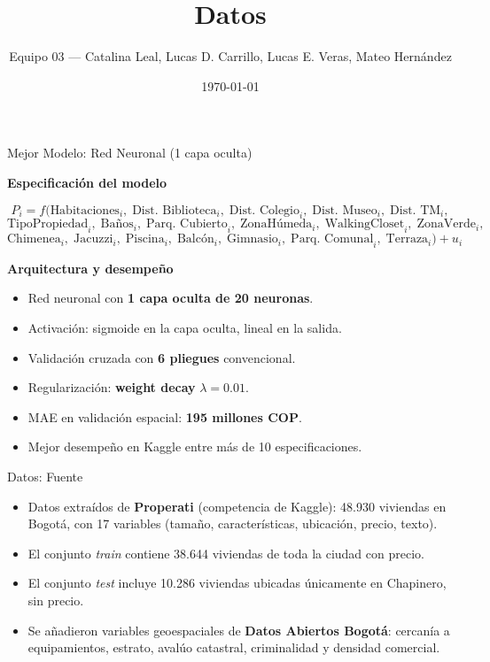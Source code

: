 \documentclass[10pt]{beamer}
\title{Datos}
\author{Equipo 03 — Catalina Leal, Lucas D. Carrillo, Lucas E. Veras, Mateo Hernández}
\institute{Big Data y Machine Learning — PS3}
\date{\today}
\begin{document}
\begin{frame}
\titlepage
\end{frame}

\begin{frame}{Mejor Modelo: Red Neuronal (1 capa oculta)}

\small

\textbf{Especificación del modelo}

\[
P_i = f(
\text{Habitaciones}_i,\;
\text{Dist.\ Biblioteca}_i,\;
\text{Dist.\ Colegio}_i,\;
\text{Dist.\ Museo}_i,\;
\text{Dist.\ TM}_i,
\]
\[
\text{TipoPropiedad}_i,\;
\text{Baños}_i,\;
\text{Parq.\ Cubierto}_i,\;
\text{ZonaHúmeda}_i,\;
\text{WalkingCloset}_i,\;
\text{ZonaVerde}_i,
\]
\[
\text{Chimenea}_i,\;
\text{Jacuzzi}_i,\;
\text{Piscina}_i,\;
\text{Balcón}_i,\;
\text{Gimnasio}_i,\;
\text{Parq.\ Comunal}_i,\;
\text{Terraza}_i
) + u_i
\]

\textbf{Arquitectura y desempeño}
\begin{itemize}
    \item Red neuronal con \textbf{1 capa oculta de 20 neuronas}.
    \item Activación: sigmoide en la capa oculta, lineal en la salida.
    \item Validación cruzada con \textbf{6 pliegues} convencional.
    \item Regularización: \textbf{weight decay} $\lambda = 0.01$.
    \item MAE en validación espacial: \textbf{195 millones COP}.
    \item Mejor desempeño en Kaggle entre más de 10 especificaciones.
\end{itemize}

\end{frame}

\begin{frame}{Datos: Fuente}
\begin{itemize}
    \item Datos extraídos de \textbf{Properati} (competencia de Kaggle): 48.930 viviendas en Bogotá, con 17 variables (tamaño, características, ubicación, precio, texto).
    \item El conjunto \textit{train} contiene 38.644 viviendas de toda la ciudad con precio.
    \item El conjunto \textit{test} incluye 10.286 viviendas ubicadas únicamente en Chapinero, sin precio.
    \item Se añadieron variables geoespaciales de \textbf{Datos Abiertos Bogotá}: cercanía a equipamientos, estrato, avalúo catastral, criminalidad y densidad comercial.
\end{itemize}
\end{frame}
\end{document}
